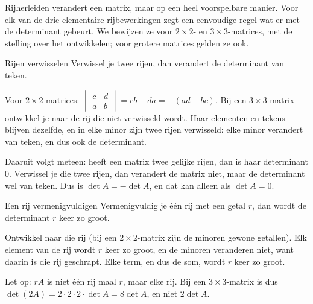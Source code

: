 Rijherleiden verandert een matrix, maar op een heel voorspelbare manier. Voor elk van de drie elementaire rijbewerkingen zegt een eenvoudige regel wat er met de determinant gebeurt. We bewijzen ze voor $2 \times 2$- en $3 \times 3$-matrices, met de stelling over het ontwikkelen; voor grotere matrices gelden ze ook.

\begin{theorie}
\begin{stelling}{Rijen verwisselen}
Verwissel je twee rijen, dan verandert de determinant van teken.
\end{stelling}

\begin{bewijs}
Voor $2 \times 2$-matrices: $\begin{vmatrix} c & d \\ a & b \end{vmatrix} = cb - da = -(ad - bc)$. Bij een $3 \times 3$-matrix ontwikkel je naar de rij die niet verwisseld wordt. Haar elementen en tekens blijven dezelfde, en in elke minor zijn twee rijen verwisseld: elke minor verandert van teken, en dus ook de determinant.
\end{bewijs}
\end{theorie}

Daaruit volgt meteen: heeft een matrix twee gelijke rijen, dan is haar determinant 0. Verwissel je die twee rijen, dan verandert de matrix niet, maar de determinant wel van teken. Dus is $\det A = -\det A$, en dat kan alleen als $\det A = 0$.

\begin{theorie}
\begin{stelling}{Een rij vermenigvuldigen}
Vermenigvuldig je één rij met een getal $r$, dan wordt de determinant $r$ keer zo groot.
\end{stelling}

\begin{bewijs}
Ontwikkel naar die rij (bij een $2 \times 2$-matrix zijn de minoren gewone getallen). Elk element van de rij wordt $r$ keer zo groot, en de minoren veranderen niet, want daarin is die rij geschrapt. Elke term, en dus de som, wordt $r$ keer zo groot.
\end{bewijs}
\end{theorie}

Let op: $rA$ is niet één rij maal $r$, maar elke rij. Bij een $3 \times 3$-matrix is dus $\det(2A) = 2 \cdot 2 \cdot 2 \cdot \det A = 8 \det A$, en niet $2 \det A$.


